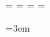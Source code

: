 \documentclass[11pt]{template/thesul}
\begin{document}
	\OddHead={{\leftmark\rightmark}{\hfil\slshape\rightmark}}
	\EvenHead={{\leftmark}{{\slshape\leftmark}\hfil}}
	\OddFoot={\hfil\thepage}
	\EvenFoot={\thepage\hfil}
	\pagestyle{ThesisHeadingsII}

	\emergencystretch=3em




	\DontFramePartsInToc
	\FrameChaptersInToc

	\ResetChaptersAtParts

	\setcounter{secnumdepth}{3}
	\renewcommand{\thesubsubsection}{\thesubsection.\alph{subsubsection}}



	\dominitoc

\end{document}
